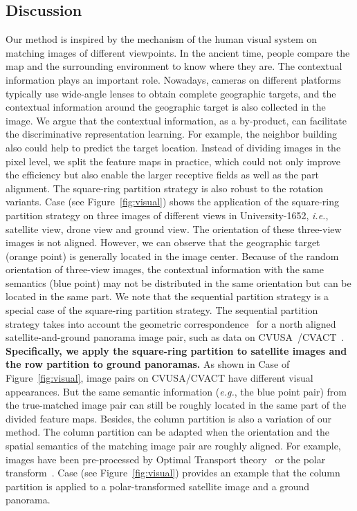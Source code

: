 \documentclass[journal]{IEEEtran}
\def\eg{\emph{e.g.}}
\def\ie{\emph{i.e.}}
\begin{document}
\subsection{Discussion}\label{discussion}
Our method is inspired by the mechanism of the human visual system on matching images of different viewpoints. In the ancient time, people compare the map and the surrounding environment to know where they are. The contextual information plays an important role. 
Nowadays, cameras on different platforms typically use wide-angle lenses to obtain complete geographic targets, and the contextual information around the geographic target is also collected in the image. We argue that the contextual information, as a by-product, can facilitate the discriminative representation learning. For example, the neighbor building also could help to predict the target location.
Instead of dividing images in the pixel level, we split the feature maps in practice, which could not only improve the efficiency but also enable the larger receptive fields as well as the part alignment. The square-ring partition strategy is also robust to the rotation variants. Case \uppercase\expandafter{} (see Figure~\ref{fig:visual}) shows the application of the square-ring partition strategy on three images of different views in University-1652, \ie, satellite view, drone view and ground view. The orientation of these three-view images is not aligned. However, we can observe that the geographic target (orange point) is generally located in the image center. Because of the random orientation of three-view images, the contextual information with the same semantics (blue point) may not be distributed in the same orientation but can be located in the same part.
We note that the sequential partition strategy is a special case of the square-ring partition strategy. The sequential partition strategy takes into account the geometric correspondence~\cite{shi_spatial-aware_nodate,Shi_2020_CVPR} for a north aligned satellite-and-ground panorama image pair, such as data on CVUSA~\cite{zhai_predicting_2017}/CVACT~\cite{liu_lending_2019}. \textbf{Specifically, we apply the square-ring partition to satellite images and the row partition to ground panoramas.}
As shown in Case \uppercase\expandafter{} of Figure~\ref{fig:visual}, image pairs on CVUSA/CVACT have different visual appearances. But the same semantic information (\eg, the blue point pair) from the true-matched image pair can still be roughly located in the same part of the divided feature maps. Besides, the column partition is also a variation of our method. The column partition can be adapted when the orientation and the spatial semantics of the matching image pair are roughly aligned. For example, images have been pre-processed by Optimal Transport theory~\cite{shi_optimal_nodate} or the polar transform~\cite{shi_spatial-aware_nodate,Shi_2020_CVPR}. Case \uppercase\expandafter{} (see Figure~\ref{fig:visual}) provides an example that the column partition is applied to a polar-transformed satellite image and a ground panorama.
\end{document}
